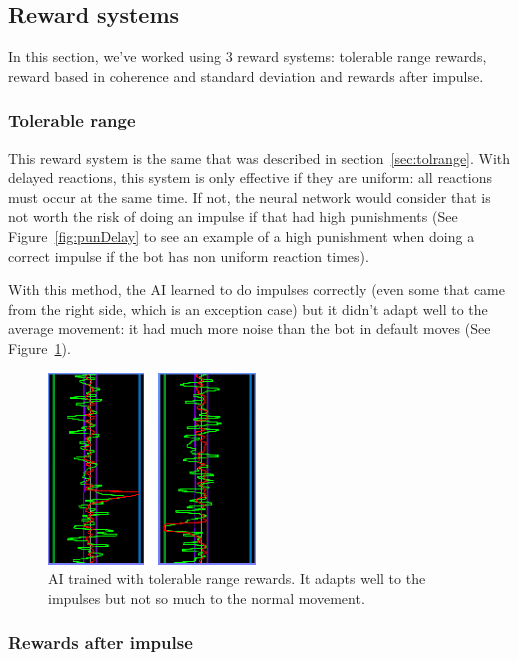 \subsection{Reward systems}
\label{sec:rtrewsys}

In this section, we've worked using 3 reward systems: tolerable range rewards, reward based in coherence and standard deviation and rewards after impulse.

\subsubsection{Tolerable range}

This reward system is the same that was described in section~\ref{sec:tolrange}. With delayed reactions, this system is only effective if they are uniform: all reactions must occur at the same time. If not, the neural network would consider that is not worth the risk of doing an impulse if that had high punishments (See Figure~\ref{fig:punDelay} to see an example of a high punishment when doing a correct impulse if the bot has non uniform reaction times).

With this method, the AI learned to do impulses correctly (even some that came from the right side, which is an exception case) but it didn't adapt well to the average movement: it had much more noise than the bot in default moves (See Figure~\ref{fig:timeTR}).

\begin{figure}[h]
  \centering
		\includegraphics[width=.6\textwidth]{img/timeTR.png}
  \caption{AI trained with tolerable range rewards. It adapts well to the impulses but not so much to the normal movement.}
  \label{fig:timeTR}
\end{figure}

\subsubsection{Rewards after impulse}
\label{sec:afterimpulse}

